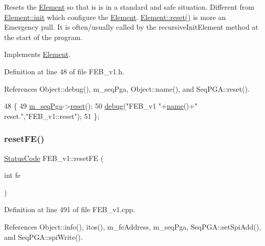 Resets the \hyperlink{classElement}{Element} so that is is in a standard and safe situation. Different from \hyperlink{classElement_af42754b5cabc198869222725218d695c}{Element\+::init} which configure the \hyperlink{classElement}{Element}. \hyperlink{classElement_a69efffa22f06909d768149715565cb56}{Element\+::reset()} is more an Emergency pull. It is often/usually called by the recursive\+Init\+Element method at the start of the program. 

Implements \hyperlink{classElement_a69efffa22f06909d768149715565cb56}{Element}.



Definition at line 48 of file F\+E\+B\+\_\+v1.\+h.



References Object\+::debug(), m\+\_\+seq\+Pga, Object\+::name(), and Seq\+P\+G\+A\+::reset().


\begin{DoxyCode}
48                \{
49     \hyperlink{classFEB__v1_a6c7804ac86796f233a8393043adf2e77}{m\_seqPga}->\hyperlink{classSeqPGA_aaadcbdd7ad7c96d2d69549b820da6809}{reset}();
50     \hyperlink{classObject_aac010553f022165573714b7014a15f0d}{debug}(\textcolor{stringliteral}{"FEB\_v1 "}+\hyperlink{classObject_a300f4c05dd468c7bb8b3c968868443c1}{name}()+\textcolor{stringliteral}{" reset."},\textcolor{stringliteral}{"FEB\_v1::reset"});
51   \};
\end{DoxyCode}
\mbox{\label{classFEB__v1_ae351e55f3d8e8f936c324ffbda6816bf}} 
\subsubsection{\texorpdfstring{reset\+F\+E()}{resetFE()}}
{\footnotesize\ttfamily \hyperlink{classStatusCode}{Status\+Code} F\+E\+B\+\_\+v1\+::reset\+FE (\begin{DoxyParamCaption}\item[{int}]{fe }\end{DoxyParamCaption})}



Definition at line 491 of file F\+E\+B\+\_\+v1.\+cpp.



References Object\+::info(), itos(), m\+\_\+fe\+Address, m\+\_\+seq\+Pga, Seq\+P\+G\+A\+::set\+Spi\+Add(), and Seq\+P\+G\+A\+::spi\+Write().



